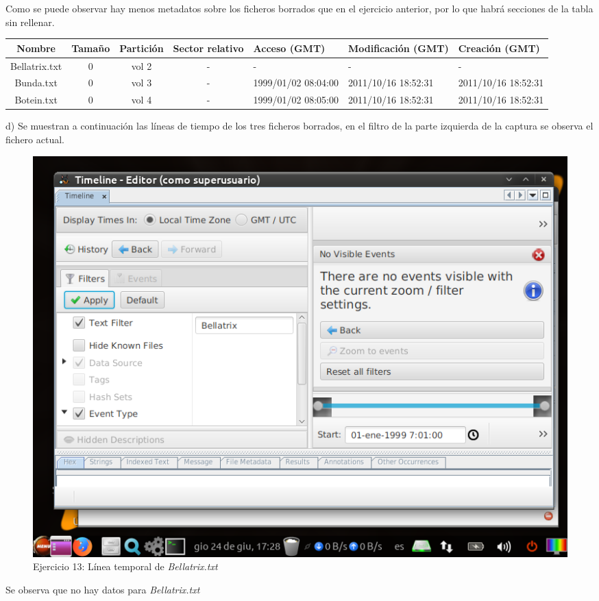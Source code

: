 \documentclass[11pt]{article}
\begin{document}
Como se puede observar hay menos metadatos sobre los ficheros borrados que en el ejercicio anterior, por lo que habrá secciones de la tabla sin rellenar.

\begin{table}[H]
    \centering
    \begin{tabular}{|c|c|c|c|p{2cm}|p{2cm}|p{2cm}|}
        \hline
        Nombre & Tamaño & Partición & Sector relativo & Acceso (GMT) & Modificación (GMT) & Creación (GMT) \\
        \hline\hline
        Bellatrix.txt & 0 & vol 2 & - & - & - & - \\
        \hline
        Bunda.txt & 0 & vol 3 & - & 1999/01/02 08:04:00 & 2011/10/16 18:52:31 & 2011/10/16 18:52:31 \\
        \hline
        Botein.txt & 0 & vol 4 & - & 1999/01/02 08:05:00 & 2011/10/16 18:52:31 & 2011/10/16 18:52:31 \\
        \hline
    \end{tabular}
\end{table}

d) Se muestran a continuación las líneas de tiempo de los tres ficheros borrados, en el filtro de la parte izquierda de la captura se observa el fichero actual.

\begin{figure}[H]
    \caption{Ejercicio 13: Línea temporal de \textit{Bellatrix.txt}}
    \centering
    \includegraphics[scale=0.7]{p03/e13-8.png}
\end{figure}

Se observa que no hay datos para \textit{Bellatrix.txt}
\end{document}
